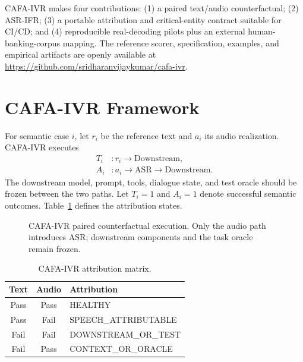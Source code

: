 \documentclass[9pt,twocolumn]{extarticle}
\begin{document}
CAFA-IVR makes four contributions: (1) a paired text/audio counterfactual; (2) ASR-IFR; (3) a portable attribution and critical-entity contract suitable for CI/CD; and (4) reproducible real-decoding pilots plus an external human-banking-corpus mapping. The reference scorer, specification, examples, and empirical artifacts are openly available at \url{https://github.com/sridharanvijaykumar/cafa-ivr}.

\section{CAFA-IVR Framework}
For semantic case $i$, let $r_i$ be the reference text and $a_i$ its audio realization. CAFA-IVR executes
\begin{align}
T_i &: r_i \rightarrow \mathrm{Downstream},\\
A_i &: a_i \rightarrow \mathrm{ASR} \rightarrow \mathrm{Downstream}.
\end{align}
The downstream model, prompt, tools, dialogue state, and test oracle should be frozen between the two paths. Let $T_i=1$ and $A_i=1$ denote successful semantic outcomes. Table~\ref{tab:attrib} defines the attribution states.

\begin{figure}[t]
\centering
{}
\caption{CAFA-IVR paired counterfactual execution. Only the audio path introduces ASR; downstream components and the task oracle remain frozen.}
\label{fig:cafa}
\end{figure}

\begin{table}[t]
\caption{CAFA-IVR attribution matrix.}
\label{tab:attrib}
\centering\scriptsize
\begin{tabular}{ccl}
\toprule
Text & Audio & Attribution\\
\midrule
Pass & Pass & HEALTHY\\
Pass & Fail & SPEECH\_ATTRIBUTABLE\\
Fail & Fail & DOWNSTREAM\_OR\_TEST\\
Fail & Pass & CONTEXT\_OR\_ORACLE\\
\bottomrule
\end{tabular}
\end{table}
\end{document}

